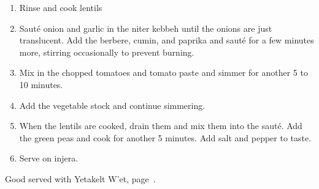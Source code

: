 
\label{yemiser-wet}

\begin{ingredients}
\end{ingredients}


\begin{recipe}
  \begin{enumerate}

  \item Rinse and cook lentils

  \item Saut\'e onion and garlic in the niter kebbeh until the onions are just translucent.
    Add the berbere, cumin, and paprika and saut\'e for a few minutes
    more, stirring occasionally to prevent burning.

  \item Mix in the chopped tomatoes and tomato paste and simmer for
    another 5 to 10 minutes.

  \item Add the vegetable stock and continue simmering.

  \item When the lentils are cooked, drain them and mix them into the
    saut\'e.  Add the green peas and cook for another 5 minutes.  Add
    salt and pepper to taste.

  \item Serve on injera.

  \end{enumerate}

  Good served with Yetakelt W'et, page~\pageref{yetakelt-wet}.
\end{recipe}

